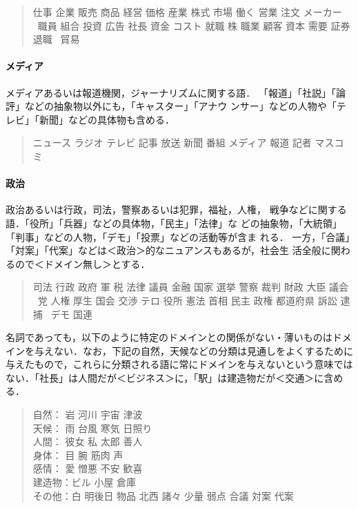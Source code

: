 \documentclass[a4j,titlepage]{jarticle}
\begin{document}
\begin{quote}
仕事 企業 販売 商品 経営 価格 産業 株式 市場 働く 営業 注文 メーカー 
\ 職員 組合 投資 広告 社長 資金 コスト 就職 株 職業 顧客 資本 需要 証券 退職 
\ 貿易
\end{quote}


\paragraph{メディア}

メディアあるいは報道機関，ジャーナリズムに関する語．
「報道」「社説」「論評」などの抽象物以外にも，「キャスター」「アナウ
ンサー」などの人物や「テレビ」「新聞」などの具体物も含める．

\begin{quote}
ニュース ラジオ テレビ 記事 放送 新聞 番組 メディア 報道 記者 マスコミ
\end{quote}

\paragraph{政治}

政治あるいは行政，司法，警察あるいは犯罪，福祉，人権，
戦争などに関する語．「役所」「兵器」などの具体物，「民主」「法律」な
どの抽象物，「大統領」「判事」などの人物，「デモ」「投票」などの活動等が含ま
れる．
一方，「合議」「対案」「代案」などは＜政治＞的なニュアンスもあるが，社会生
活全般に関わるので＜ドメイン無し＞とする．

\begin{quote}
司法 行政 政府 軍 税 法律 議員 金融 国家 選挙 警察 裁判 財政 大臣 議会 
\ 党 人権 厚生 国会 交渉 テロ 役所 憲法 首相 民主 政権 都道府県 訴訟 逮捕 
\ デモ 国連
\end{quote}


\vspace{10pt}

名詞であっても，以下のように特定のドメインとの関係がない・薄いものはドメ
インを与えない．なお，下記の自然，天候などの分類は見通しをよくするために
与えたもので，これらに分類される語に常にドメインを与えないという意味では
ない．「社長」は人間だが＜ビジネス＞に，「駅」は建造物だが＜交通＞に含め
る．

\begin{quote}
自然： 岩 河川 宇宙 津波 \\
天候： 雨 台風 寒気 日照り \\
人間： 彼女 私 太郎 善人 \\
身体： 目 腕 筋肉 声 \\
感情： 愛 憎悪 不安 歓喜 \\
建造物：ビル 小屋 倉庫 \\
その他：白 明後日 物品 北西 諸々 少量 弱点 合議 対案 代案 \\
\end{quote}
\end{document}
